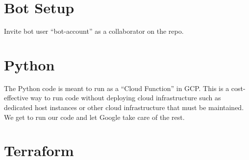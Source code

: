 \section{\label{sec:bot}Bot Setup}

Invite bot user ``bot-account'' as a collaborator on the repo.

\section{\label{sec:Python}Python}

\justifying
The Python code is meant to run as a ``Cloud Function'' in GCP. This is a cost-effective way to run code without deploying cloud infrastructure such as dedicated host instances or other cloud infrastructure that must be maintained. We get to run our code and let Google take care of the rest.

\section{\label{sec:Terraform}Terraform}


\clearpage
\begin{versionhistory}
\end{versionhistory}

\clearpage




